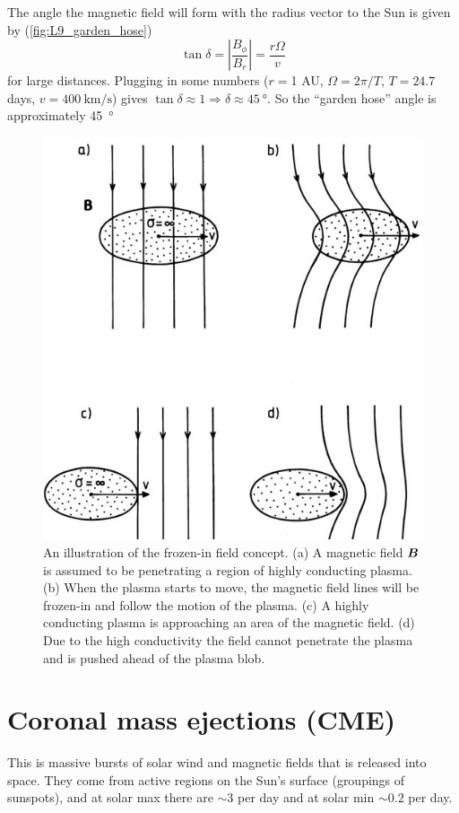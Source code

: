 The angle the magnetic field will form with the radius vector to the Sun is
given by (\cref{fig:L9_garden_hose})
\begin{equation*}
    \tan\delta=\left|\frac{B_\phi}{B_r}\right|=\frac{r\Omega}{v}
\end{equation*}
for large distances. Plugging in some numbers (\(r=\)1 AU, \(\Omega=2\pi/T\), \(T=24.7\) days, \(v=\SI{400}{\kilo\metre/\second}\)) gives \(\tan\delta\approx 1\Rightarrow \delta\approx\SI{45}{\degree}\). So the ``garden hose'' angle is approximately \SI{45}{\degree}
\begin{figure}[t]
    \centering
    \includegraphics[width=.4\linewidth]{bilder/L9_froze_in.jpg}
    \caption{An illustration of the frozen-in field concept. (a) A magnetic field \(\boldsymbol{B}\) is assumed to be penetrating a region of highly conducting plasma. (b) When the plasma starts to move, the magnetic field lines will be frozen-in and follow the motion of the plasma. (c) A highly conducting plasma is approaching an area of the magnetic field. (d) Due to the high conductivity the field cannot penetrate the plasma and is pushed ahead of the plasma blob.}\label{fig:L9_frozen_in}
\end{figure}

\section{Coronal mass ejections (CME)}
This is massive bursts of solar wind and magnetic fields that is released into space. They come from active regions on the Sun’s surface (groupings of sunspots), and at solar max there are \(\sim 3\) per day and at solar min \(\sim 0.2\) per day.